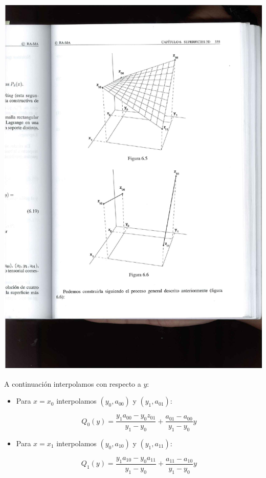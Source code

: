 \documentclass[ebook,oneside]{memoir}
\begin{document}
\begin{center}
\includegraphics[scale=0.45]{6_6.pdf}
\end{center}

A continuaci\'{o}n interpolamos con respecto a $y$:
\begin{itemize}
\item Para $x=x_0$ interpolamos $(y_0,a_{00})$ y $(y_1,a_{01})$:

$$Q_0(y)=\frac{y_1 a_{00}-y_0 z_{01}}{y_1-y_0}+\frac{a_{01}-a_{00}}{y_1-y_0}y$$
\item Para $x=x_1$ interpolamos $(y_0,a_{10})$ y $(y_1,a_{11})$:

$$Q_1(y)=\frac{y_1 a_{10}-y_0 a_{11}}{y_1-y_0}+\frac{a_{11}-a_{10}}{y_1-y_0}y$$

\end{itemize}
\end{document}
